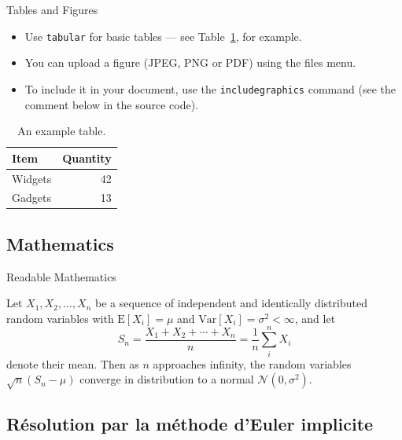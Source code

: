 \documentclass{beamer}
\begin{document}
\begin{frame}{Tables and Figures}

\begin{itemize}
\item Use \texttt{tabular} for basic tables --- see Table~\ref{tab:widgets}, for example.
\item You can upload a figure (JPEG, PNG or PDF) using the files menu. 
\item To include it in your document, use the \texttt{includegraphics} command (see the comment below in the source code).
\end{itemize}


\begin{table}
\centering
\begin{tabular}{l|r}
Item & Quantity \\\hline
Widgets & 42 \\
Gadgets & 13
\end{tabular}
\caption{\label{tab:widgets}An example table.}
\end{table}

\end{frame}

\subsection{Mathematics}

\begin{frame}{Readable Mathematics}

Let $X_1, X_2, \ldots, X_n$ be a sequence of independent and identically distributed random variables with $\text{E}[X_i] = \mu$ and $\text{Var}[X_i] = \sigma^2 < \infty$, and let
\[ S_n = \frac{X_1 + X_2 + \cdots + X_n}{n}
      = \frac{1}{n}\sum_{i}^{n} X_i \]
denote their mean. Then as $n$ approaches infinity, the random variables $\sqrt{n}(S_n - \mu)$ converge in distribution to a normal $\mathcal{N}(0, \sigma^2)$.

\end{frame}

\subsection{Résolution par la méthode d’Euler implicite}
\end{document}
